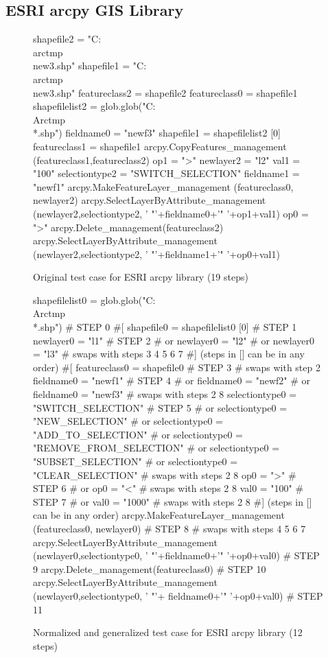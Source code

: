 \subsection{ESRI arcpy GIS Library}

\begin{figure}
{\scriptsize 
\begin{code}
shapefile2 = "C:\\arctmp\\new3.shp" 
shapefile1 = "C:\\arctmp\\new3.shp" 
featureclass2 = shapefile2 
featureclass0 = shapefile1 
shapefilelist2 = 
   glob.glob("C:\\Arctmp\\*.shp") 
fieldname0 = "newf3" 
shapefile1 = shapefilelist2 [0] 
featureclass1 = shapefile1 
arcpy.CopyFeatures\_management
   (featureclass1,featureclass2) 
op1 = ">" 
newlayer2 = "l2" 
val1 = "100" 
selectiontype2 = "SWITCH\_SELECTION" 
fieldname1 = "newf1" 
arcpy.MakeFeatureLayer\_management
   (featureclass0, newlayer2) 
arcpy.SelectLayerByAttribute\_management
   (newlayer2,selectiontype2,
   ' "'+fieldname0+'" '+op1+val1) 
op0 = ">" 
arcpy.Delete\_management(featureclass2) 
arcpy.SelectLayerByAttribute\_management
   (newlayer2,selectiontype2,
   ' "'+fieldname1+'" '+op0+val1) 
\end{code}
}
\caption{Original test case for ESRI arcpy library (19 steps)}
\end{figure}

\begin{figure}
{\scriptsize 
\begin{code}
shapefilelist0 = 
   glob.glob("C:\\Arctmp\\*.shp")        \# STEP 0
\#[
shapefile0 = shapefilelist0 [0]        \# STEP 1
newlayer0 = "l1"                       \# STEP 2
\#  or newlayer0 = "l2" 
\#  or newlayer0 = "l3" 
\#  swaps with steps 3 4 5 6 7
\#] (steps in [] can be in any order)
\#[
featureclass0 = shapefile0             \# STEP 3
\#  swaps with step 2
fieldname0 = "newf1"                   \# STEP 4
\#  or fieldname0 = "newf2" 
\#  or fieldname0 = "newf3" 
\#  swaps with steps 2 8
selectiontype0 = "SWITCH\_SELECTION"    \# STEP 5
\#  or selectiontype0 = "NEW\_SELECTION" 
\#  or selectiontype0 = "ADD\_TO\_SELECTION" 
\#  or selectiontype0 = "REMOVE\_FROM\_SELECTION"
\#  or selectiontype0 = "SUBSET\_SELECTION"
\#  or selectiontype0 = "CLEAR\_SELECTION"   
\#  swaps with steps 2 8
op0 = ">"                              \# STEP 6
\#  or op0 = "<" 
\#  swaps with steps 2 8
val0 = "100"                           \# STEP 7
\#  or val0 = "1000" 
\#  swaps with steps 2 8
\#] (steps in [] can be in any order)
arcpy.MakeFeatureLayer\_management
   (featureclass0, newlayer0)          \# STEP 8
\#  swaps with steps 4 5 6 7
arcpy.SelectLayerByAttribute\_management
   (newlayer0,selectiontype0,
   ' "'+fieldname0+'" '+op0+val0)      \# STEP 9
arcpy.Delete\_management(featureclass0) \# STEP 10
arcpy.SelectLayerByAttribute\_management
   (newlayer0,selectiontype0,
   ' "'+ fieldname0+'" '+op0+val0)     \# STEP 11
\end{code}
}
\caption{Normalized and generalized test case for ESRI arcpy library
  (12 steps)}
\end{figure}